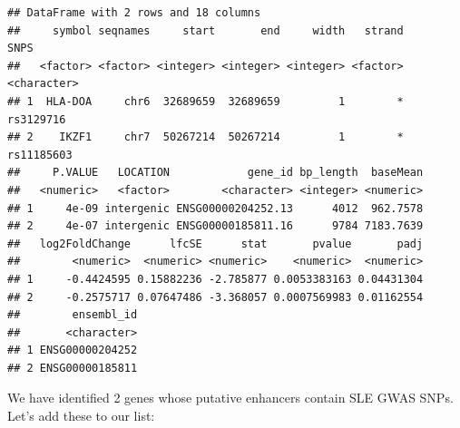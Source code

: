 \documentclass[9pt,a4paper,]{extarticle}
\newenvironment{Shaded}{\begin{snugshade}}{\end{snugshade}}
\newcommand{\KeywordTok}[1]{\textcolor[rgb]{0.13,0.29,0.53}{\textbf{#1}}}
\newcommand{\DataTypeTok}[1]{\textcolor[rgb]{0.13,0.29,0.53}{#1}}
\newcommand{\StringTok}[1]{\textcolor[rgb]{0.31,0.60,0.02}{#1}}
\newcommand{\OperatorTok}[1]{\textcolor[rgb]{0.81,0.36,0.00}{\textbf{#1}}}
\newcommand{\NormalTok}[1]{#1}
\begin{document}
\begin{verbatim}
## DataFrame with 2 rows and 18 columns
##     symbol seqnames     start       end     width   strand        SNPS
##   <factor> <factor> <integer> <integer> <integer> <factor> <character>
## 1  HLA-DOA     chr6  32689659  32689659         1        *   rs3129716
## 2    IKZF1     chr7  50267214  50267214         1        *  rs11185603
##     P.VALUE   LOCATION            gene_id bp_length  baseMean
##   <numeric>   <factor>        <character> <integer> <numeric>
## 1     4e-09 intergenic ENSG00000204252.13      4012  962.7578
## 2     4e-07 intergenic ENSG00000185811.16      9784 7183.7639
##   log2FoldChange      lfcSE      stat       pvalue       padj
##        <numeric>  <numeric> <numeric>    <numeric>  <numeric>
## 1     -0.4424595 0.15882236 -2.785877 0.0053383163 0.04431304
## 2     -0.2575717 0.07647486 -3.368057 0.0007569983 0.01162554
##        ensembl_id
##       <character>
## 1 ENSG00000204252
## 2 ENSG00000185811
\end{verbatim}

We have identified 2 genes whose putative enhancers contain SLE GWAS SNPs.
Let's add these to our list:

\begin{Shaded}
\end{Shaded}
\end{document}
